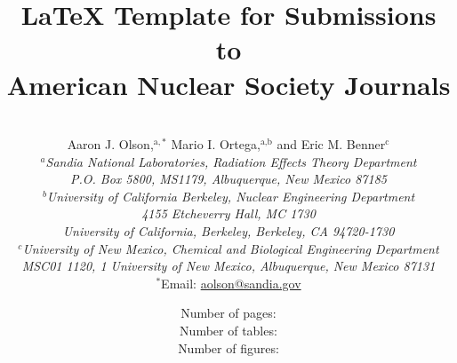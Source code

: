 \documentclass{article}                                                                           %
\begin{document}

\title{{\LaTeX} Template for Submissions to \\American Nuclear Society Journals} %

\author{
\vspace{20mm}
\\Aaron J. Olson,$^{\text{a},\ast}$ Mario I. Ortega,$^{\text{a,b}}$ and Eric M. Benner$^\text{c}$ \\[4pt] %
\textit{$^a$Sandia National Laboratories, Radiation Effects Theory Department}\\[-10pt]       %
\textit{P.O. Box 5800, MS1179, Albuquerque, New Mexico 87185} \\[-5pt]
\textit{$^b$University of California Berkeley, Nuclear Engineering Department} \\ [-10pt]
\textit{4155 Etcheverry Hall, MC 1730} \\ [-10pt]
\textit{University of California, Berkeley, Berkeley, CA 94720-1730} \\ [-5pt]
\textit{$^c$University of New Mexico, Chemical and Biological Engineering Department} \\ [-10pt]
\textit{MSC01 1120, 1 University of New Mexico, Albuquerque, New Mexico 87131} \\ [-2pt]
{$^\ast$Email: \href{mailto:aolson@sandia.gov}{aolson@sandia.gov}}}       %

\date{                               %
\vspace{40mm}
Number of pages: \pageref*{LastPage} \\
Number of tables: \totaltables \\
Number of figures: \totalfigures
}

\clearpage\maketitle
\thispagestyle{empty}


\pagebreak
~\vfill
\end{document}
